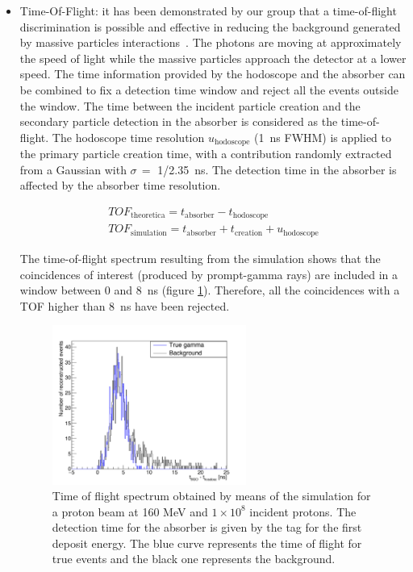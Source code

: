 \begin{itemize}
\item Time-Of-Flight: it has been demonstrated by our group that a time-of-flight discrimination is possible and effective in reducing the background generated by massive particles interactions~\cite{Testa:2010aa}. The photons are moving at approximately the speed of light while the massive particles approach the detector at a lower speed. The time information provided by the hodoscope and the absorber can be combined to fix a detection time window and reject all the events outside the window. The time between the incident particle creation and the secondary particle detection in the absorber is considered as the time-of-flight. The hodoscope time resolution $u_{\mathrm{hodoscope}}$ (1~ns FWHM) is applied to the primary particle creation time, with a contribution randomly extracted from a Gaussian with $\sigma\,=$ 1/2.35~ns. The detection time in the absorber is affected by the absorber time resolution.

 \begin{eqnarray}
TOF_{\mathrm{theoretica}} = t_{\mathrm{absorber}}-t_{\mathrm{hodoscope}} \\
TOF_{\mathrm{simulation}} = t_{\mathrm{absorber}}+t_{\mathrm{creation}} + u_{\mathrm{hodoscope}}
\label{TOF_equation}
\end{eqnarray} 

The time-of-flight spectrum resulting from the simulation shows that the coincidences of interest (produced by prompt-gamma rays) are included in a window between 0 and 8~ns (figure \ref{fig:fig_TOF_distribution_CC_simulation_Hadronth}). Therefore, all the coincidences with a TOF higher than 8~ns have been rejected.
\begin{figure}	
  \centering
  \includegraphics[width=0.6\textwidth]{./Figure/2015_01_04_TOF_spectra_NoCut_1Proton_ResolTemporelle_applied_these.jpg}
  \caption{Time of flight spectrum obtained by means of the simulation for a proton beam at 160 MeV and $1\times10^{8}$ incident protons. The detection time for the absorber is given by the tag for the first deposit energy. The blue curve represents the time of flight for true events and the black one represents the background.}	
  \label{fig:fig_TOF_distribution_CC_simulation_Hadronth}
\end{figure}


\end{itemize}
